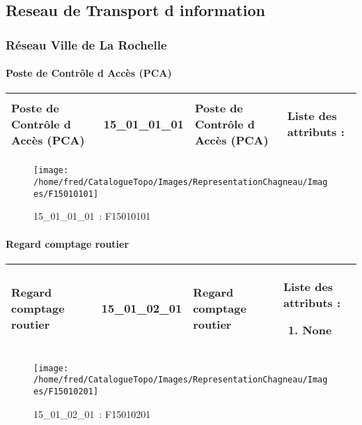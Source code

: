 \documentclass[12pt,titlepage,oneside]{book}
\begin{document}
\subsection{Reseau de Transport d information}
\subsubsection{\large Réseau Ville de La Rochelle}
\paragraph{Poste de Contrôle d Accès (PCA)}
\noindent
\vspace{\baselineskip}

\renewcommand{\arraystretch}{1.2}
\begin{supertabular}{|p{10cm}|c|p{13cm}|p{12cm}|}
 Poste de Contrôle d Accès (PCA) & 15\_01\_01\_01 & Poste de Contrôle d Accès (PCA) & Liste des attributs :
\begin{enumerate}
\end{enumerate}
\\
\hline
\end{supertabular}
\begin{figure}[h!]
  \hfill         %
  \begin{minipage}[t]{3cm}
    \begin{center}
      \texttt{[image: /home/fred/CatalogueTopo/Images/RepresentationChagneau/Images/F15010101]}
      \caption[~15\_01\_01\_01]{\small{15\_01\_01\_01~:} \tiny{F15010101}}\label{F15010101}
    \end{center}
  \end{minipage}
\end{figure}


\paragraph{Regard comptage routier}
\noindent
\vspace{\baselineskip}

\renewcommand{\arraystretch}{1.2}
\begin{supertabular}{|p{10cm}|c|p{13cm}|p{12cm}|}
 Regard comptage routier & 15\_01\_02\_01 & Regard comptage routier & Liste des attributs :
\begin{enumerate}
  \item None\end{enumerate}
\\
\hline
\end{supertabular}
\begin{figure}[h!]
  \hfill         %
  \begin{minipage}[t]{3cm}
    \begin{center}
      \texttt{[image: /home/fred/CatalogueTopo/Images/RepresentationChagneau/Images/F15010201]}
      \caption[~15\_01\_02\_01]{\small{15\_01\_02\_01~:} \tiny{F15010201}}\label{F15010201}
    \end{center}
  \end{minipage}
\end{figure}
\end{document}
